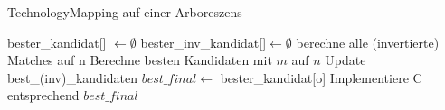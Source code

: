 \documentclass[11pt, a4paper, german]{article}
\begin{document}
\begin{algorithm}[H]
 \LinesNumbered
 \DontPrintSemicolon
 \caption{TechnologyMapping auf einer Arboreszens}

 bester\_kandidat[] $\gets \emptyset$\;
 bester\_inv\_kandidat[]$ \gets \emptyset$\;
 {
   berechne alle (invertierte) Matches auf n\;
   {
      Berechne besten Kandidaten mit $m$ auf $n$\;
      Update best\_(inv)\_kandidaten\;
   }
 }
 $best\_final \gets$ bester\_kandidat[o] \;
 Implementiere C entsprechend $best\_final$\;
\end{algorithm}\ \\




\end{document}

